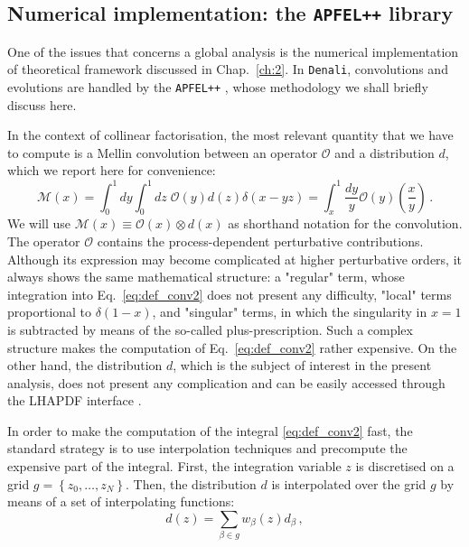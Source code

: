 \subsection{Numerical implementation: the \texttt{APFEL++} library}
\label{subsec:APFEL}
One of the issues that concerns a global analysis is the numerical implementation of theoretical framework discussed in Chap.~\ref*{ch:2}. In \texttt{Denali}, convolutions and evolutions are handled by the \texttt{APFEL++} \cite{Bertone:2016lga,Bertone:2017gds}, whose methodology we shall briefly discuss here.\par
In the context of collinear factorisation, the most relevant quantity that we have to compute is a Mellin convolution between an operator $\mathcal{O}$ and a distribution $d$, which we report here for convenience:
\begin{equation}
  \mathcal{M}(x) = \int_{0}^{1} dy \int_{0}^{1} dz \; \mathcal{O}(y) d(z) \delta(x-yz) = \int_{x}^{1} \frac{dy}{y} \mathcal{O}(y) \left( \frac{x}{y} \right)\,.
  \label{eq:def_conv2}
\end{equation}
We will use $\mathcal{M}(x) \equiv \mathcal{O}(x) \otimes d(x)$ as shorthand notation for the convolution. The operator $\mathcal{O}$ contains the process-dependent perturbative contributions. Although its expression may become complicated at higher perturbative orders, it always shows the same mathematical structure: a "regular" term, whose integration into Eq.~\eqref{eq:def_conv2} does not present any difficulty, "local" terms proportional to $\delta(1-x)$, and "singular" terms, in which the singularity in $x=1$ is subtracted by means of the so-called plus-prescription. Such a complex structure makes the computation of Eq.~\eqref{eq:def_conv2} rather expensive. On the other hand, the distribution $d$, which is the subject of interest in the present analysis, does not present any complication and can be easily accessed through the LHAPDF interface \cite{Buckley:2014ana}.\par
In order to make the computation of the integral \eqref{eq:def_conv2} fast, the standard strategy is to use interpolation techniques and precompute the expensive part of the integral. First, the integration variable $z$ is discretised on a grid $g=\left\{ z_0,\dots, z_N\right\}$. Then, the distribution $d$ is interpolated over the grid $g$ by means of a set of interpolating functions:
\begin{equation}
  d(z) = \sum_{\beta \in g} w_{\beta}(z) d_{\beta} \,,
  \label{eq:inter}
\end{equation}
